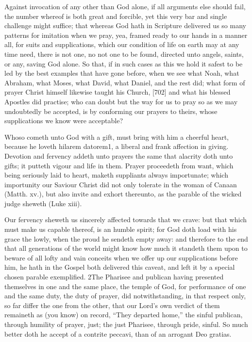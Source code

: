 Against invocation of any other than God alone, if all arguments else should fail, the number whereof is both great and forcible, yet this very bar and single challenge might suffice; that whereas God hath in Scripture delivered us so many patterns for imitation when we pray, yea, framed ready to our hands in a manner all, for suits and supplications, which our condition of life on earth may at any time need, there is not one, no not one to be found, directed unto angels, saints, or any, saving God alone. So that, if in such cases as this we hold it safest to be led by the best examples that have gone before, when we see what Noah, what Abraham, what Moses, what David, what Daniel, and the rest did; what form of prayer Christ himself likewise taught his Church, [702] and what his blessed Apostles did practise; who can doubt but the way for us to pray so as we may undoubtedly be accepted, is by conforming our prayers to theirs, whose supplications we know were acceptable?

Whoso cometh unto God with a gift, must bring with him a cheerful heart, because he loveth hilarem datorem1, a liberal and frank affection in giving. Devotion and fervency addeth unto prayers the same that alacrity doth unto gifts; it putteth vigour and life in them. Prayer proceedeth from want, which being seriously laid to heart, maketh suppliants always importunate; which importunity our Saviour Christ did not only tolerate in the woman of Canaan (Matth. xv.), but also invite and exhort thereunto, as the parable of the wicked judge sheweth (Luke xiii).

Our fervency sheweth us sincerely affected towards that we crave: but that which must make us capable thereof, is an humble spirit; for God doth load with his grace the lowly, when the proud he sendeth empty away: and therefore to the end that all generations of the world might know how much it standeth them upon to beware of all lofty and vain conceits when we offer up our supplications before him, he hath in the Gospel both delivered this caveat, and left it by a special chosen parable exemplified. 2The Pharisee and publican having presented themselves in one and the same place, the temple of God, for performance of one and the same duty, the duty of prayer, did notwithstanding, in that respect only, so far differ the one from the other, that our Lord’s own verdict of them remaineth as (you know) on record, “They departed home,” the sinful publican, through humility of prayer, just; the just Pharisee, through pride, sinful. So much better doth he accept of a contrite peccavi, than of an arrogant Deo gratias.

